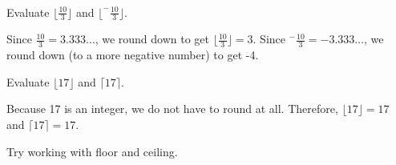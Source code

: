 \begin{exam}
\label{exam_floor_ceiling_calculate}
~
    \begin{apart}
        \item Evaluate $\lfloor \frac{10}{3} \rfloor$ and $\lfloor ^-\frac{10}{3} \rfloor$.
            \begin{soln}
                Since $\frac{10}{3} = 3.333\ldots$, we round down to get $\lfloor \frac{10}{3} \rfloor=3$.  Since $^-\frac{10}{3} = -3.333\ldots$, we round down (to a more negative number) to get -4. 
            \end{soln}        
        \item Evaluate $\lfloor 17 \rfloor$ and $\lceil 17 \rceil$.
            \begin{soln}
                Because 17 is an integer, we do not have to round at all. Therefore, $\lfloor 17 \rfloor = 17$ and $\lceil 17 \rceil = 17$.
            \end{soln}
    \end{apart}
\end{exam}

Try working with floor and ceiling. 

